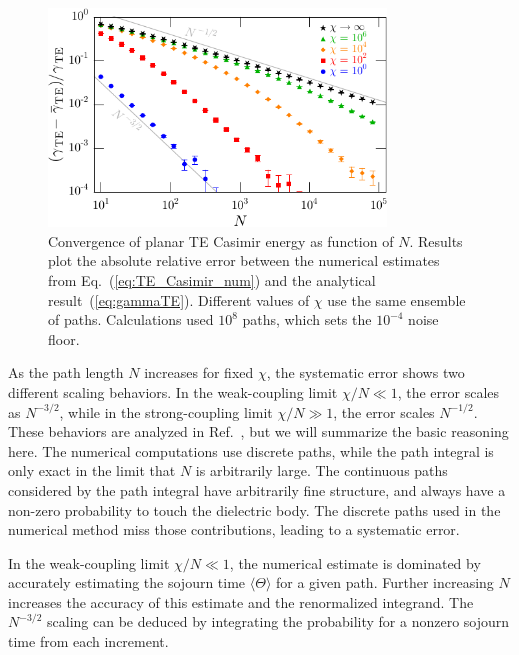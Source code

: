 \begin{figure}
  \centering
  \includegraphics[width=0.8\textwidth]{fig/temp/conv_TE2wallN3}
  \caption[Convergence of planar TE Casimir energy as function of $N$ for various $\chi$.]{
    Convergence of planar TE Casimir energy as function of $N$.  Results plot the 
    absolute relative error between the numerical estimates from Eq.~(\ref{eq:TE_Casimir_num})
    and the analytical result~(\ref{eq:gammaTE}).
    Different values of $\chi$ use the same ensemble of paths.
    Calculations used $10^8$ paths, which sets the $10^{-4}$ noise floor.}
  \label{fig:conv_wall}
\end{figure}

As the path length $N$ increases for fixed $\chi$, the systematic error shows two different scaling behaviors.  
In the weak-coupling limit $\chi/N\ll 1$, the error scales as $N^{-3/2}$, while in the strong-coupling limit
$\chi/N\gg 1$, the error scales $N^{-1/2}$.  
These behaviors are analyzed in Ref.~\cite{Mackrory2016}, 
but we will summarize the basic reasoning here.  The numerical computations use discrete paths, 
while the path integral is only exact in the limit that $N$ is arbitrarily large.  The continuous paths considered by the path integral
have arbitrarily fine structure, and always have a non-zero probability to touch the dielectric body.
The discrete paths used in the numerical method miss those contributions, leading to a systematic error.  

In the weak-coupling limit $\chi/N\ll 1$, the numerical estimate is dominated by accurately estimating the sojourn
time $\langle\Theta\rangle$ for a given path.  Further increasing $N$ increases the accuracy of this 
estimate and the renormalized integrand.  The $N^{-3/2}$ scaling can be deduced by integrating the probability for a nonzero sojourn time
from each increment.  

